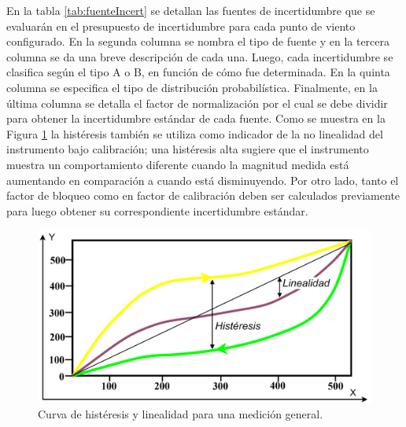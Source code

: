 En la tabla \ref{tab:fuenteIncert} se detallan las fuentes de incertidumbre que se evaluarán en el presupuesto de incertidumbre para cada punto de viento configurado. En la segunda columna se nombra el tipo de fuente y en la tercera columna se da una breve descripción de cada una. Luego, cada incertidumbre se clasifica según el tipo A o B, en función de cómo fue determinada. En la quinta columna se especifica el tipo de distribución probabilística. Finalmente, en la última columna se detalla el factor de normalización por el cual se debe dividir para obtener la incertidumbre estándar de cada fuente. Como se muestra en la Figura \ref{fig:histeresis} la histéresis también se utiliza como indicador de la no linealidad del instrumento bajo calibración; una histéresis alta sugiere que el instrumento muestra un comportamiento diferente cuando la magnitud medida está aumentando en comparación a cuando está disminuyendo. Por otro lado, tanto el factor de bloqueo como en factor de calibración deben ser calculados previamente para luego obtener su correspondiente incertidumbre estándar.
\begin{figure}[H]
    \centering
    \includegraphics[width=0.85\linewidth]{Figuras/calculoIncertidumbre/histeresis.png}
    \caption{Curva de histéresis y linealidad para una medición general. \cite{Workshop_WMO2021}}
    \label{fig:histeresis}
\end{figure}




